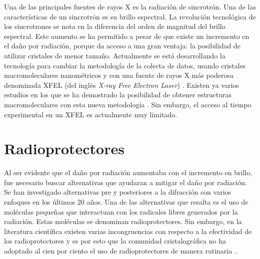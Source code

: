Una de las principales fuentes de rayos X es la radiación de sincrotrón. Una de las características de un sincrotrón es su brillo espectral. La revolución tecnológica de los sincrotrones se nota en la diferencia del orden de magnitud del brillo espectral. Este aumento se ha permitido a pesar de que existe un incremento en el daño por radiación, porque da acceso a una gran ventaja: la posibilidad de utilizar cristales de menor tamaño.  Actualmente se está desarrollando la tecnología para cambiar la metodología de la colecta de datos, usando cristales macromoleculares nanométricos y con una fuente de rayos X más poderosa denominada XFEL (del inglés \emph{X-ray Free Electron Laser}) \cite{Martin-Garcia2016}. Existen ya varios estudios en los que se ha demostrado la posibilidad de obtener estructuras macromoleculares con esta nueva metodología \cite{Martin-Garcia2016}. Sin embargo, el acceso al tiempo experimental en un XFEL es actualmente muy limitado.

\section{Radioprotectores}
Al ser evidente que el daño por radiación aumentaba con el incremento en brillo, fue necesario buscar alternativas que ayudaran a mitigar el daño por radiación. Se han investigado alternativas pre y posteriores a la difracción con varios enfoques en los últimos 20 años\cite{Garman2017}. Una de las alternativas que resalta es el uso de moléculas pequeñas que interactuan con los radicales libres generados por la radiación. Estas moléculas se denominan radioprotectores.  Sin embargo, en la literatura científica existen varias incongruencias con respecto a la efectividad de los radioprotectores y es por esto que la comunidad cristalográfica no ha adoptado al cien por ciento el uso de radioprotectores de manera rutinaria \cite{Nowak2009, Allan2013}.
